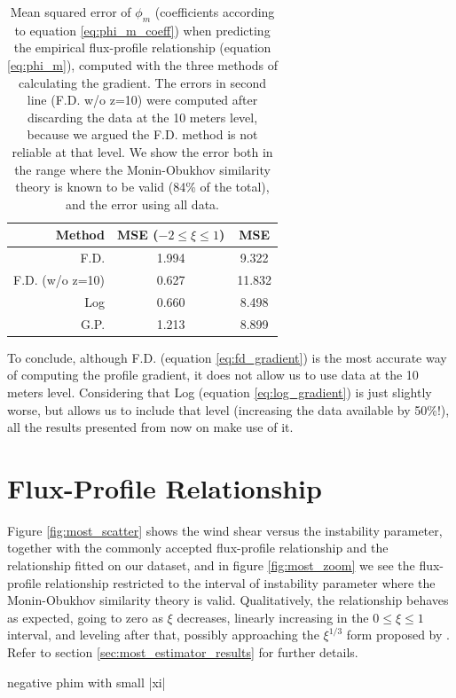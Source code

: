 \documentclass[12pt]{book}
\begin{document}
\begin{table}[]
\centering
\caption{Mean squared error of $\phi_m$ (coefficients according to equation \ref{eq:phi_m_coeff}) when predicting the empirical flux-profile relationship (equation \ref{eq:phi_m}), computed with the three methods of calculating the gradient. The errors in second line (F.D. w/o z=10) were computed after discarding the data at the 10 meters level, because we argued the F.D. method is not reliable at that level. We show the error both in the range where the Monin-Obukhov similarity theory is known to be valid (84\% of the total), and the error using all data.}
\label{tbl:gradient_errors}
\begin{tabular}{r|c|c}
Method & MSE ($-2\leq\xi\leq1$) & MSE \\ \hline
F.D. & 1.994 & 9.322 \\
F.D. (w/o z=10) & 0.627  & 11.832 \\
Log & 0.660 & 8.498 \\
G.P. & 1.213 & 8.899
\end{tabular}
\end{table}

To conclude, although F.D. (equation \ref{eq:fd_gradient}) is the most accurate way of computing the profile gradient, it does not allow us to use data at the 10 meters level. Considering that Log (equation \ref{eq:log_gradient}) is just slightly worse, but allows us to include that level (increasing the data available by 50\%!), all the results presented from now on make use of it.


\section{Flux-Profile Relationship}
Figure \ref{fig:most_scatter} shows the wind shear versus the instability parameter, together with the commonly accepted flux-profile relationship and the relationship fitted on our dataset, and in figure \ref{fig:most_zoom} we see the flux-profile relationship restricted to the interval of instability parameter where the Monin-Obukhov similarity theory is valid. Qualitatively, the relationship behaves as expected, going to zero as $\xi$ decreases, linearly increasing in the $0\leq\xi\leq1$ interval, and leveling after that, possibly approaching the $\xi^{1/3}$ form proposed by \cite{sheba_phim}. Refer to section \ref{sec:most_estimator_results} for further details.

negative phim with small |xi|
\end{document}
